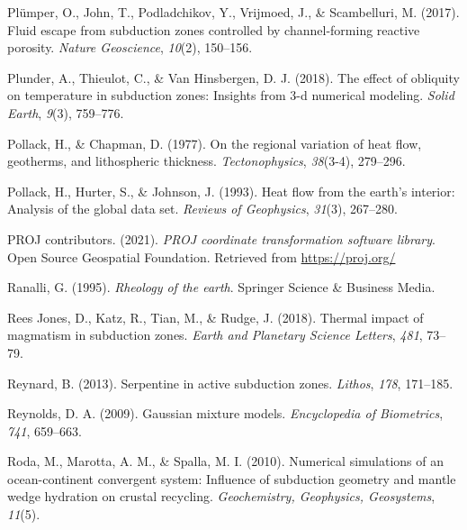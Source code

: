 \begin{CSLReferences}{1}{1}
\leavevmode{}%
Plümper, O., John, T., Podladchikov, Y., Vrijmoed, J., \& Scambelluri, M. (2017). Fluid escape from subduction zones controlled by channel-forming reactive porosity. \emph{Nature Geoscience}, \emph{10}(2), 150--156.

\leavevmode{}%
Plunder, A., Thieulot, C., \& Van Hinsbergen, D. J. (2018). The effect of obliquity on temperature in subduction zones: Insights from 3-d numerical modeling. \emph{Solid Earth}, \emph{9}(3), 759--776.

\leavevmode{}%
Pollack, H., \& Chapman, D. (1977). On the regional variation of heat flow, geotherms, and lithospheric thickness. \emph{Tectonophysics}, \emph{38}(3-4), 279--296.

\leavevmode{}%
Pollack, H., Hurter, S., \& Johnson, J. (1993). Heat flow from the earth's interior: Analysis of the global data set. \emph{Reviews of Geophysics}, \emph{31}(3), 267--280.

\leavevmode{}%
PROJ contributors. (2021). \emph{{PROJ} coordinate transformation software library}. Open Source Geospatial Foundation. Retrieved from \url{https://proj.org/}

\leavevmode{}%
Ranalli, G. (1995). \emph{Rheology of the earth}. Springer Science \& Business Media.

\leavevmode{}%
Rees Jones, D., Katz, R., Tian, M., \& Rudge, J. (2018). Thermal impact of magmatism in subduction zones. \emph{Earth and Planetary Science Letters}, \emph{481}, 73--79.

\leavevmode{}%
Reynard, B. (2013). Serpentine in active subduction zones. \emph{Lithos}, \emph{178}, 171--185.

\leavevmode{}%
Reynolds, D. A. (2009). Gaussian mixture models. \emph{Encyclopedia of Biometrics}, \emph{741}, 659--663.

\leavevmode{}%
Roda, M., Marotta, A. M., \& Spalla, M. I. (2010). Numerical simulations of an ocean-continent convergent system: Influence of subduction geometry and mantle wedge hydration on crustal recycling. \emph{Geochemistry, Geophysics, Geosystems}, \emph{11}(5).


\end{CSLReferences}
